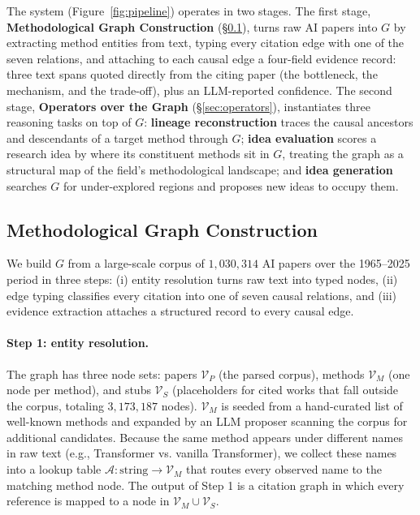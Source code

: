 \documentclass{opendatalab}
\begin{document}
The system (Figure~\ref{fig:pipeline}) operates in two stages. The first stage, \textbf{Methodological Graph Construction} (§\ref{sec:graph}), turns raw AI papers into $G$ by extracting method entities from text, typing every citation edge with one of the seven relations, and attaching to each causal edge a four-field evidence record: three text spans quoted directly from the citing paper (the bottleneck, the mechanism, and the trade-off), plus an LLM-reported confidence. The second stage, \textbf{Operators over the Graph} (§\ref{sec:operators}), instantiates three reasoning tasks on top of $G$: \textbf{lineage reconstruction} traces the causal ancestors and descendants of a target method through $G$; \textbf{idea evaluation} scores a research idea by where its constituent methods sit in $G$, treating the graph as a structural map of the field's methodological landscape; and \textbf{idea generation} searches $G$ for under-explored regions and proposes new ideas to occupy them.

\subsection{Methodological Graph Construction}
\label{sec:graph}

We build $G$ from a large-scale corpus of $1{,}030{,}314$ AI papers over the 1965--2025 period in three steps: (i) entity resolution turns raw text into typed nodes, (ii) edge typing classifies every citation into one of seven causal relations, and (iii) evidence extraction attaches a structured record to every causal edge.

\paragraph{Step 1: entity resolution.}
The graph has three node sets: papers $\mathcal{V}_P$ (the parsed corpus), methods $\mathcal{V}_M$ (one node per method), and stubs $\mathcal{V}_S$ (placeholders for cited works that fall outside the corpus, totaling $3{,}173{,}187$ nodes). $\mathcal{V}_M$ is seeded from a hand-curated list of well-known methods and expanded by an LLM proposer scanning the corpus for additional candidates. Because the same method appears under different names in raw text (e.g., Transformer vs. vanilla Transformer), we collect these names into a lookup table $\mathcal{A}: \text{string} \to \mathcal{V}_M$ that routes every observed name to the matching method node. The output of Step 1 is a citation graph in which every reference is mapped to a node in $\mathcal{V}_M \cup \mathcal{V}_S$.
\end{document}
